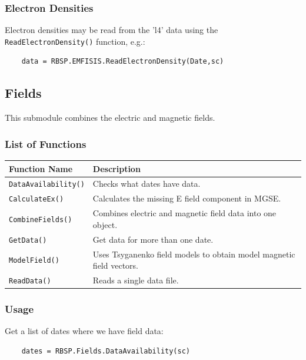 	\subsubsection{Electron Densities}
	
	Electron densities may be read from the 'l4' data using the \texttt{ReadElectronDensity()} function, e.g.:
	
	\begin{verbatim}
	data = RBSP.EMFISIS.ReadElectronDensity(Date,sc)
	\end{verbatim}
	
	\subsection{Fields}
	
	This submodule combines the electric and magnetic fields.
	
	\subsubsection{List of Functions}
	
	\begin{tabular}{|l|l|}
	\hline
	Function Name & Description \\
	\hline
	\texttt{DataAvailability()} & Checks what dates have data. \\
	\texttt{CalculateEx()} & Calculates the missing E field component in MGSE. \\
	\texttt{CombineFields()} & Combines electric and magnetic field data into one object. \\
	\texttt{GetData()} & Get data for more than one date. \\
	\texttt{ModelField()} & Uses Tsyganenko field models to obtain model magnetic field vectors. \\
	\texttt{ReadData()} & Reads a single data file. \\
	\hline
	\end{tabular}
	
	\subsubsection{Usage}
	
	Get a list of dates where we have field data:
	
	\begin{verbatim}
	dates = RBSP.Fields.DataAvailability(sc)
	\end{verbatim}
	
